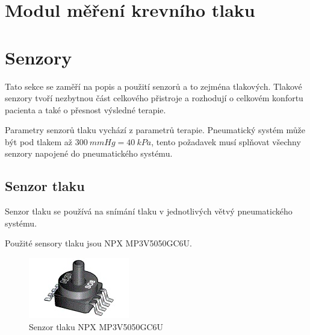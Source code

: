 \section{Modul měření krevního tlaku}


\section{Senzory}
Tato sekce se zaměří na popis a použití senzorů a to zejména tlakových. Tlakové senzory tvoří nezbytnou část celkového přistroje a rozhodují o celkovém konfortu pacienta a také o přesnost výsledné terapie. \par
Parametry senzorů tlaku vychází z parametrů terapie. Pneumatický systém může být pod tlakem až $300 \ mmHg = 40 \ kPa$, tento požadavek musí splňovat všechny senzory napojené do pneumatického systému.

\subsection{Senzor tlaku}
Senzor tlaku se používá na snímání tlaku v jednotlivých větvý pneumatického systému. \par


Použité sensory tlaku jsou NPX MP3V5050GC6U. 

\begin{figure}[H]
    \centering
    \includegraphics{pictures/nxp_sensor.jpg}
    \caption{Senzor tlaku NPX MP3V5050GC6U}
    \label{fig:nxp}
\end{figure}

